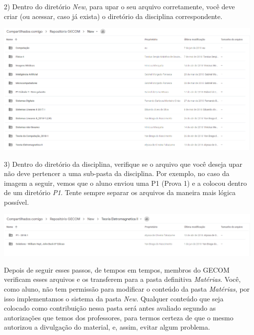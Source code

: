     2) Dentro do diretório \textit{New}, para upar o seu arquivo corretamente, você deve criar (ou acessar, caso já exista) o diretório da disciplina correspondente.
	\begin{center}
		\includegraphics[width=\textwidth]{assets/driveGecomPastaNew.png}
    \end{center}
    
    \begin{center}
    	3) Dentro do diretório da disciplina, verifique se o arquivo que você deseja upar não deve pertencer a uma sub-pasta da disciplina. Por exemplo, no caso da imagem a seguir, vemos que o aluno enviou uma P1 (Prova 1) e a colocou dentro de um diretório \textit{P1}. Tente sempre separar os arquivos da maneira mais lógica possível.

		\includegraphics[width=\textwidth]{assets/driveGecomDiretorioP1.png}
	
    \end{center}
    
    Depois de seguir esses passos, de tempos em tempos, membros do GECOM verificam esses arquivos e os transferem para a pasta definitiva \textit{Matérias}. Você, como aluno, não tem permissão para modificar o conteúdo da pasta \textit{Matérias}, por isso implementamos o sistema da pasta \textit{New}. Qualquer conteúdo que seja colocado como contribuição nessa pasta será antes avaliado segundo as autorizações que temos dos professores, para termos certeza de que o mesmo autorizou a divulgação do material, e, assim, evitar algum problema. 